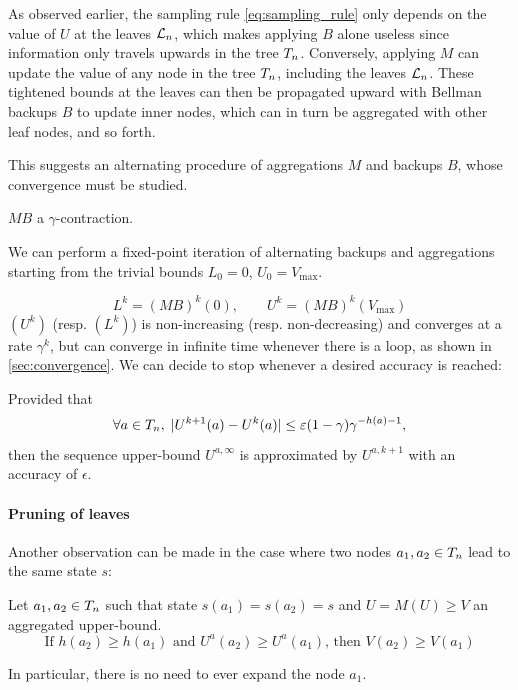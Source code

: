 \documentclass[runningheads]{llncs}
\begin{document}
\begin{remark}
As observed earlier, the sampling rule \eqref{eq:sampling_rule} only depends on the value of $U$ at the leaves $\mathcal{L}_n$, which makes applying $B$ alone useless since information only travels upwards in the tree $T_n$. Conversely, applying $M$ can update the value of any node in the tree $T_n$, including the leaves $\mathcal{L}_n$. These tightened bounds at the leaves can then be propagated upward with Bellman backups $B$ to update inner nodes, which can in turn be aggregated with other leaf nodes, and so forth.
\end{remark}

This suggests an alternating procedure of aggregations $M$ and backups $B$, whose convergence must be studied.

\begin{proposition}[Contractivity of $MB$]
\label{prop:contractivity}
$M B$ a $\gamma$-contraction.
\end{proposition}

We can perform a fixed-point iteration of alternating backups and aggregations starting from the trivial bounds $L_0=0$, $U_0 = V_{\max}$.

\begin{equation}
    \label{eq:recursion}
    L^k = (M B)^k(0), \qquad
    U^k = (M B)^k(V_{\max})
\end{equation}
$(U^k)$ (resp. $(L^k)$) is non-increasing (resp. non-decreasing) and converges at a rate $\gamma^k$, but can converge in infinite time whenever there is a loop, as shown in \autoref{sec:convergence}. We can decide to stop whenever a desired accuracy is reached: 

\begin{proposition}
\label{prop:early-stopping}
Provided that
\[\forall a\in T_n,\; |U^{k+1}(a) - U^k(a)| \leq \varepsilon (1-\gamma)\gamma^{-h(a)-1},\]
then the sequence upper-bound $U^{a,\infty}$ is approximated by $U^{a,k+1}$ with an accuracy of $\epsilon$.
\end{proposition}

\paragraph{Pruning of leaves}

Another observation can be made in the case where two nodes $a_1,a_2\in T_n$ lead to the same state $s$:
\begin{proposition}
\label{prop:pruning}
Let $a_1,a_2\in T_n$ such that state $s(a_1) = s(a_2) = s$ and $U = M(U) \geq V$ an aggregated upper-bound. 
\begin{equation}
\label{eq:pruning}
    \text{If } h(a_2) \geq h(a_1) \text{ and } U^a(a_2) \geq U^a(a_1)
    \text{, then }V(a_2) \geq V(a_1)
\end{equation}

In particular, there is no need to ever expand the node $a_1$.
\end{proposition}
\end{document}
